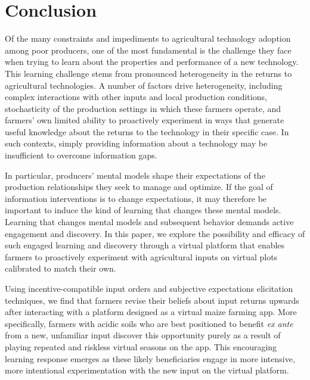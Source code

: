 \documentclass[12pt,letterpaper]{article}
\begin{document}
 \section{Conclusion}\label{sec:conclusion}
Of the many constraints and impediments to agricultural technology adoption among poor producers, one of the most fundamental is the challenge they face when trying to learn about the properties and performance of a new technology. This learning challenge stems from pronounced heterogeneity in the returns to agricultural technologies. A number of factors drive heterogeneity, including complex interactions with other inputs and local production conditions, stochasticity of the production settings in which these farmers operate, and farmers' own limited ability to proactively experiment in ways that generate useful knowledge about the returns to the technology in their specific case. In such contexts, simply providing information about a technology may be insufficient to overcome information gaps. 

In particular, producers' mental models shape their expectations of the production relationships they seek to manage and optimize. If the goal of information interventions is to change expectations, it may therefore be important to induce the kind of learning that changes these mental models. Learning that changes mental models and subsequent behavior demands active engagement and discovery. In this paper, we explore the possibility and efficacy of such engaged learning and discovery through a virtual platform that enables farmers to proactively experiment with agricultural inputs on virtual plots calibrated to match their own. 

Using incentive-compatible input orders and subjective expectations elicitation techniques, we find that farmers revise their beliefs about input returns upwards after interacting with a platform designed as a virtual maize farming app. More specifically, farmers with acidic soils who are best positioned to benefit \emph{ex ante} from a new, unfamiliar input discover this opportunity purely as a result of playing repeated and riskless virtual seasons on the app. This encouraging learning response emerges as these likely beneficiaries engage in more intensive, more intentional experimentation with the new input on the virtual platform. 
\end{document}

